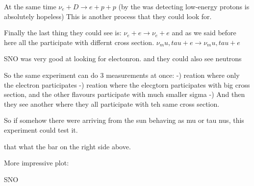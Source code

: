 {At the same time
$\nu_e + D \rightarrow e + p + p$
(by the was detecting low-energy protons is absolutely hopeless)
This is another process that they could look for. 

Finally the last thing they could see is: 
$\nu_e + e  \rightarrow \nu_e +e$
and as we said before here all the \nus participate with differnt cross section. 
$\nu_mu,tau + e  \rightarrow \nu_mu,tau +e$


SNO was very good at looking for electonron. and they could also see neutrons

So the same experiment can do 3 measurements at once:
 -) reation where only the electron participates
 -) reation where the elecgtorn participates with big cross section, and the other flavours participate with much smaller sigma
 -) And then they see another where they all participate with teh same cross section. 


So if somehow there were \nus arriving from the sun behaving as mu or tau nus, this experiment could test it. 

that what the bar on the right side above. 

More impressive plot: 


SNO 


 




}



